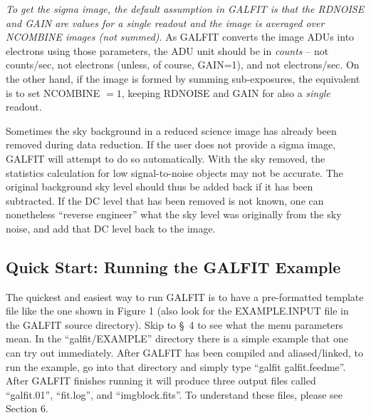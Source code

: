 \documentclass[preprint]{aastex}
\begin{document}
{\it To get the sigma image, the default assumption in GALFIT is that the
RDNOISE and GAIN are values for a single readout and the image is {\it
averaged} over NCOMBINE images (not summed)}.  As GALFIT converts the image
ADUs into electrons using those parameters, the ADU unit should be in {\it
counts} -- not counts/sec, not electrons (unless, of course, GAIN=1), and not
electrons/sec.  On the other hand, if the image is formed by summing
sub-exposures, the equivalent is to set NCOMBINE $= 1$, keeping RDNOISE and
GAIN for also a {\it single} readout.

Sometimes the sky background in a reduced science image has already been
removed during data reduction.  If the user does not provide a sigma image,
GALFIT will attempt to do so automatically.  With the sky removed, the
statistics calculation for low signal-to-noise objects may not be accurate.
The original background sky level should thus be added back if it has been
subtracted.  If the DC level that has been removed is not known, one can
nonetheless ``reverse engineer'' what the sky level was originally from the
sky noise, and add that DC level back to the image.


\subsection {Quick Start: Running the GALFIT Example}

The quickest and easiest way to run GALFIT is to have a pre-formatted template
file like the one shown in Figure 1 (also look for the EXAMPLE.INPUT file in
the GALFIT source directory).  Skip to \S~4 to see what the menu parameters
mean.  In the ``galfit/EXAMPLE'' directory there is a simple example that one
can try out immediately.  After GALFIT has been compiled and aliased/linked,
to run the example, go into that directory and simply type ``galfit
galfit.feedme''.  After GALFIT finishes running it will produce three output
files called ``galfit.01'', ``fit.log'', and ``imgblock.fits''.  To understand
these files, please see Section 6.
\end{document}
